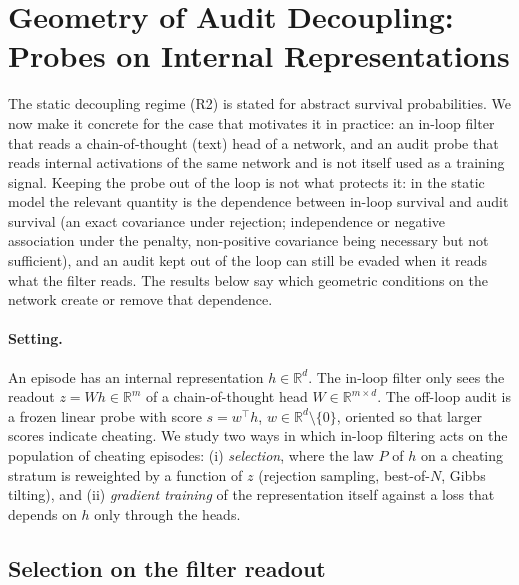 
\section{Geometry of Audit Decoupling: Probes on Internal Representations}\label{sec:geometry}

The static decoupling regime (R2) is stated for abstract survival probabilities. We now make it concrete for the case that motivates it in practice: an in-loop filter that reads a chain-of-thought (text) head of a network, and an audit probe that reads internal activations of the same network and is not itself used as a training signal. Keeping the probe out of the loop is not what protects it: in the static model the relevant quantity is the dependence between in-loop survival and audit survival (an exact covariance under rejection; independence or negative association under the penalty, non-positive covariance being necessary but not sufficient), and an audit kept out of the loop can still be evaded when it reads what the filter reads. The results below say which geometric conditions on the network create or remove that dependence.

\paragraph{Setting.} An episode has an internal representation $h \in \mathbb{R}^d$. The in-loop filter only sees the readout $z = W h \in \mathbb{R}^m$ of a chain-of-thought head $W \in \mathbb{R}^{m \times d}$. The off-loop audit is a frozen linear probe with score $s = w^\top h$, $w \in \mathbb{R}^d \setminus \{0\}$, oriented so that larger scores indicate cheating. We study two ways in which in-loop filtering acts on the population of cheating episodes: (i) \emph{selection}, where the law $P$ of $h$ on a cheating stratum is reweighted by a function of $z$ (rejection sampling, best-of-$N$, Gibbs tilting), and (ii) \emph{gradient training} of the representation itself against a loss that depends on $h$ only through the heads.

\subsection{Selection on the filter readout}

